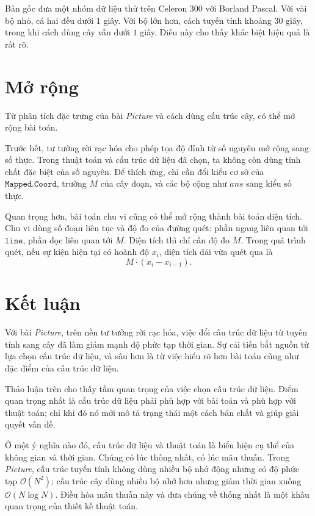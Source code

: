 \documentclass[11pt]{article}
\newcommand{\Oh}{\mathcal{O}}
\begin{document}
Bản gốc đưa một nhóm dữ liệu thử trên Celeron 300 với Borland Pascal. Với vài
bộ nhỏ, cả hai đều dưới \(1\) giây. Với bộ lớn hơn, cách tuyến tính khoảng
\(30\) giây, trong khi cách dùng cây vẫn dưới \(1\) giây. Điều này cho thấy
khác biệt hiệu quả là rất rõ.

\section{Mở rộng}

Từ phân tích đặc trưng của bài \textit{Picture} và cách dùng cấu trúc cây, có
thể mở rộng bài toán.

Trước hết, tư tưởng rời rạc hóa cho phép tọa độ đỉnh từ số nguyên mở rộng sang
số thực. Trong thuật toán và cấu trúc dữ liệu đã chọn, ta không còn dùng tính
chất đặc biệt của số nguyên. Để thích ứng, chỉ cần đổi kiểu cơ sở của
\(\texttt{Mapped.Coord}\), trường \(M\) của cây đoạn, và các bộ cộng như
\(\mathit{ans}\) sang kiểu số thực.

Quan trọng hơn, bài toán chu vi cũng có thể mở rộng thành bài toán diện tích.
Chu vi dùng số đoạn liên tục và độ đo của đường quét: phần ngang liên quan tới
\(\texttt{line}\), phần dọc liên quan tới \(M\). Diện tích thì chỉ cần độ đo
\(M\). Trong quá trình quét, nếu sự kiện hiện tại có hoành độ \(x_i\), diện
tích dải vừa quét qua là
\[
  M\cdot (x_i-x_{i-1}).
\]

\section{Kết luận}

Với bài \textit{Picture}, trên nền tư tưởng rời rạc hóa, việc đổi cấu trúc dữ
liệu từ tuyến tính sang cây đã làm giảm mạnh độ phức tạp thời gian. Sự cải
tiến bắt nguồn từ lựa chọn cấu trúc dữ liệu, và sâu hơn là từ việc hiểu rõ hơn
bài toán cũng như đặc điểm của cấu trúc dữ liệu.

Thảo luận trên cho thấy tầm quan trọng của việc chọn cấu trúc dữ liệu. Điểm
quan trọng nhất là cấu trúc dữ liệu phải phù hợp với bài toán và phù hợp với
thuật toán; chỉ khi đó nó mới mô tả trạng thái một cách bản chất và giúp giải
quyết vấn đề.

Ở một ý nghĩa nào đó, cấu trúc dữ liệu và thuật toán là biểu hiện cụ thể của
không gian và thời gian. Chúng có lúc thống nhất, có lúc mâu thuẫn. Trong
\textit{Picture}, cấu trúc tuyến tính không dùng nhiều bộ nhớ động nhưng có độ
phức tạp \(\Oh(N^2)\); cấu trúc cây dùng nhiều bộ nhớ hơn nhưng giảm thời gian
xuống \(\Oh(N\log N)\). Điều hòa mâu thuẫn này và đưa chúng về thống nhất là
một khâu quan trọng của thiết kế thuật toán.
\end{document}

